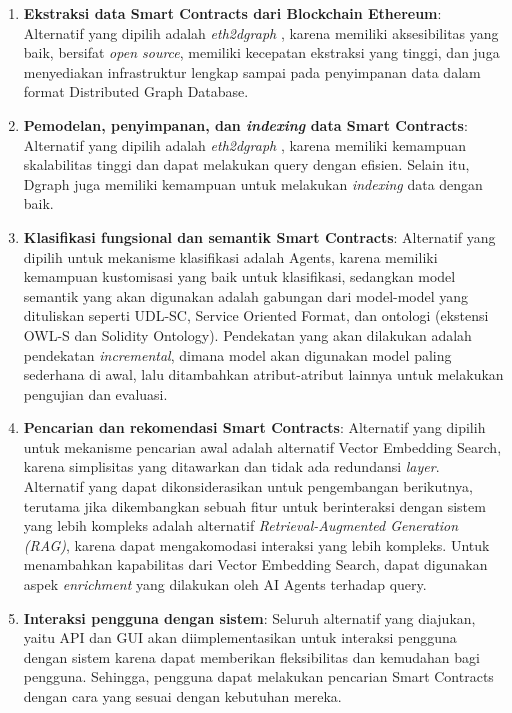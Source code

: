 \begin{enumerate}
	\item \textbf{Ekstraksi data Smart Contracts dari Blockchain Ethereum}: Alternatif yang dipilih adalah \textit{eth2dgraph} \parencite{aimar2023extraction}, karena memiliki aksesibilitas yang baik, bersifat \textit{open source}, memiliki kecepatan ekstraksi yang tinggi, dan juga menyediakan infrastruktur lengkap sampai pada penyimpanan data dalam format Distributed Graph Database.
	\item \textbf{Pemodelan, penyimpanan, dan \textit{indexing} data Smart Contracts}: Alternatif yang dipilih adalah \textit{eth2dgraph} \parencite{aimar2023extraction}, karena memiliki kemampuan skalabilitas tinggi dan dapat melakukan query dengan efisien. Selain itu, Dgraph juga memiliki kemampuan untuk melakukan \textit{indexing} data dengan baik.
	\item \textbf{Klasifikasi fungsional dan semantik Smart Contracts}: Alternatif yang dipilih untuk mekanisme klasifikasi adalah Agents, karena memiliki kemampuan kustomisasi yang baik untuk klasifikasi, sedangkan model semantik yang akan digunakan adalah gabungan dari model-model yang dituliskan seperti UDL-SC, Service Oriented Format, dan ontologi (ekstensi OWL-S dan Solidity Ontology). Pendekatan yang akan dilakukan adalah pendekatan \textit{incremental}, dimana model akan digunakan model paling sederhana di awal, lalu ditambahkan atribut-atribut lainnya untuk melakukan pengujian dan evaluasi.
	\item \textbf{Pencarian dan rekomendasi Smart Contracts}: Alternatif yang dipilih untuk mekanisme pencarian awal adalah alternatif Vector Embedding Search, karena simplisitas yang ditawarkan dan tidak ada redundansi \textit{layer}. Alternatif yang dapat dikonsiderasikan untuk pengembangan berikutnya, terutama jika dikembangkan sebuah fitur untuk berinteraksi dengan sistem yang lebih kompleks adalah alternatif \textit{Retrieval-Augmented Generation (RAG)}, karena dapat mengakomodasi interaksi yang lebih kompleks. Untuk menambahkan kapabilitas dari Vector Embedding Search, dapat digunakan aspek \textit{enrichment} yang dilakukan oleh AI Agents terhadap query.
	\item \textbf{Interaksi pengguna dengan sistem}: Seluruh alternatif yang diajukan, yaitu API dan GUI akan diimplementasikan untuk interaksi pengguna dengan sistem karena dapat memberikan fleksibilitas dan kemudahan bagi pengguna. Sehingga, pengguna dapat melakukan pencarian Smart Contracts dengan cara yang sesuai dengan kebutuhan mereka.
\end{enumerate}